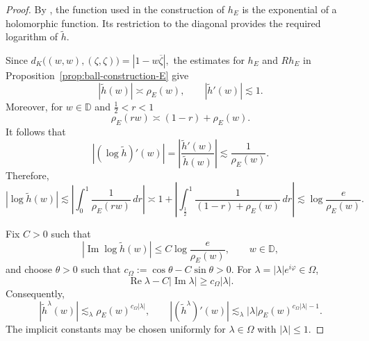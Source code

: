 \documentclass[a4paper,12pt]{amsart}
\theoremstyle{definition}
\def\D{\mathbb D}
\begin{document}
\begin{proof}
By \cite[proof of Theorem~4.3, p.~551]{Bruna1986}, the function used
in the construction of $h_E$ is the exponential of a holomorphic
function. Its restriction to the diagonal provides the required
logarithm of $\widetilde h$.

Since
$
    d_K\bigl((w,w),(\zeta,\zeta)\bigr)
    =|1-w\overline\zeta|,
$
the estimates for $h_E$ and $Rh_E$ in
Proposition~\ref{prop:ball-construction-E} give
\[
    |\widetilde h(w)|\asymp\rho_E(w),
    \qquad
    |\widetilde h'(w)|\lesssim1.
\]
Moreover, for $w \in \D$ and $\frac{1}{2}<r< 1$
\begin{equation}
    \rho_E(r w)
    \asymp
    (1-r)+\rho_E(w).
    \label{eq:rho-comparison}
\end{equation}
It follows that
\[
    \left|(\log\widetilde h)'(w)\right|
    =\left|\frac{\widetilde h'(w)}{\widetilde h(w)}\right|
    \lesssim\frac1{\rho_E(w)}.
\]
Therefore,
\[
    |\log\widetilde h(w)|
    \lesssim \left| \int_0^1 \frac{1}{\rho_E(rw) } \,dr \right| \asymp 1 + \left| \int_{\frac{1}{2}}^1 \frac{1}{(1-r)+\rho_E(w)} \,dr \right| \lesssim \log\frac{e}{\rho_E(w)}.
\]

Fix $C>0$ such that
\[
    |\operatorname{Im}\log\widetilde h(w)|
    \leq C\log\frac{e}{\rho_E(w)},
    \qquad w\in\mathbb D,
\]
and choose $\theta>0$ such that
$
    c_\Omega:=\cos\theta-C\sin\theta>0.
$
For $\lambda=|\lambda|e^{i\varphi}\in\Omega$,
$$
    \operatorname{Re}\lambda-C|\operatorname{Im}\lambda|
    \geq c_\Omega|\lambda|.
$$
Consequently,
\begin{equation}
    |\widetilde h^\lambda(w)|
    \lesssim_\lambda
    \rho_E(w)^{c_\Omega|\lambda|},
    \qquad
    |(\widetilde h^\lambda)'(w)|
    \lesssim_\lambda
    |\lambda|\rho_E(w)^{c_\Omega|\lambda|-1}.
    \label{eq:h-lambda-estimates}
\end{equation}
The implicit constants may be chosen uniformly for
$\lambda\in\Omega$ with $|\lambda|\leq1$.


\end{proof}
\end{document}
